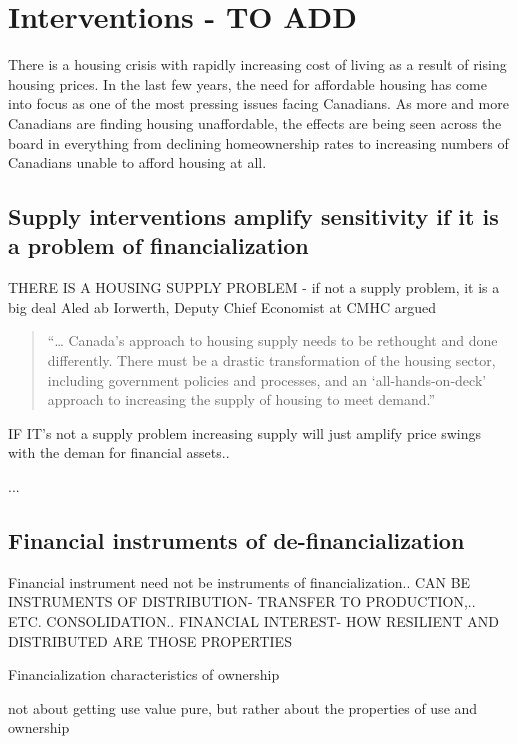 \chapter{Interventions - TO ADD} \label{chapter-interventions}

There is a housing crisis with rapidly increasing cost of living as a result of rising housing prices. 
In the last few years, the need for affordable housing has come into focus as one of the most pressing issues facing Canadians. As more and more Canadians are finding housing unaffordable, the effects are being seen across the board in everything from declining homeownership rates to increasing numbers of Canadians unable to afford housing at all.





\section{Supply interventions amplify sensitivity if it is a problem of financialization}

THERE IS A HOUSING SUPPLY PROBLEM  - if not a supply problem, it is a big deal
Aled ab Iorwerth, Deputy Chief Economist at CMHC argued
\begin{quotation}
     “… Canada’s approach to housing supply needs to be rethought and done differently. There must be a drastic transformation of the housing sector, including government policies and processes, and an ‘all-hands-on-deck’ approach to increasing the supply of housing to meet demand.”\cite{CanadaHousingSupply2022}
\end{quotation}

IF IT's not a supply problem increasing supply will just amplify price swings with the deman for financial assets..


...

\section{Financial instruments of de-financialization}
Financial instrument need not be instruments of financialization..
CAN BE INSTRUMENTS OF DISTRIBUTION- TRANSFER TO PRODUCTION,.. ETC. CONSOLIDATION.. FINANCIAL INTEREST- HOW RESILIENT AND DISTRIBUTED ARE THOSE PROPERTIES

Financialization
characteristics of ownership

not about getting use value pure, but rather about the properties of use and ownership

